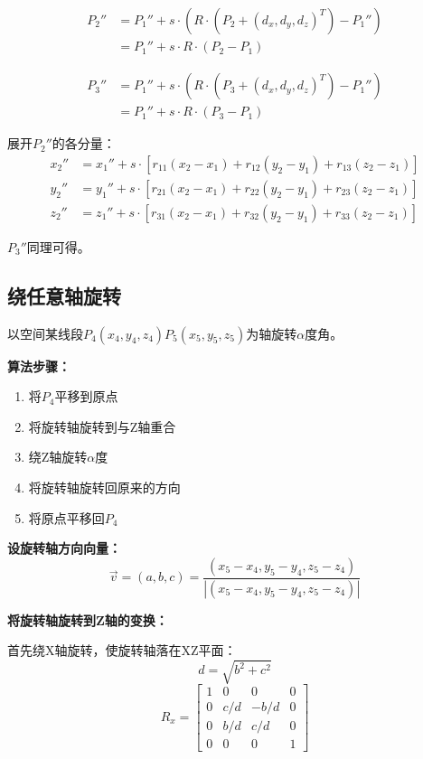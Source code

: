 \documentclass[12pt,a4paper]{article}
\begin{document}
\begin{align*}
P_2'' &= P_1'' + s \cdot (R \cdot (P_2 + (d_x,d_y,d_z)^T) - P_1'') \\
      &= P_1'' + s \cdot R \cdot (P_2 - P_1)
\end{align*}

\begin{align*}
P_3'' &= P_1'' + s \cdot (R \cdot (P_3 + (d_x,d_y,d_z)^T) - P_1'') \\
      &= P_1'' + s \cdot R \cdot (P_3 - P_1)
\end{align*}

展开$P_2''$的各分量：
\begin{align*}
x_2'' &= x_1'' + s \cdot [r_{11}(x_2-x_1) + r_{12}(y_2-y_1) + r_{13}(z_2-z_1)] \\
y_2'' &= y_1'' + s \cdot [r_{21}(x_2-x_1) + r_{22}(y_2-y_1) + r_{23}(z_2-z_1)] \\
z_2'' &= z_1'' + s \cdot [r_{31}(x_2-x_1) + r_{32}(y_2-y_1) + r_{33}(z_2-z_1)]
\end{align*}

$P_3''$同理可得。

\subsection{绕任意轴旋转}

以空间某线段$P_4(x_4,y_4,z_4)P_5(x_5,y_5,z_5)$为轴旋转$\alpha$度角。

\textbf{算法步骤：}
\begin{enumerate}
    \item 将$P_4$平移到原点
    \item 将旋转轴旋转到与Z轴重合
    \item 绕Z轴旋转$\alpha$度
    \item 将旋转轴旋转回原来的方向
    \item 将原点平移回$P_4$
\end{enumerate}

\textbf{设旋转轴方向向量：}
\[
\vec{v} = (a, b, c) = \frac{(x_5-x_4, y_5-y_4, z_5-z_4)}{|(x_5-x_4, y_5-y_4, z_5-z_4)|}
\]

\textbf{将旋转轴旋转到Z轴的变换：}

首先绕X轴旋转，使旋转轴落在XZ平面：
\[
d = \sqrt{b^2 + c^2}
\]
\[
R_x = \begin{bmatrix}
1 & 0 & 0 & 0 \\
0 & c/d & -b/d & 0 \\
0 & b/d & c/d & 0 \\
0 & 0 & 0 & 1
\end{bmatrix}
\]
\end{document}
